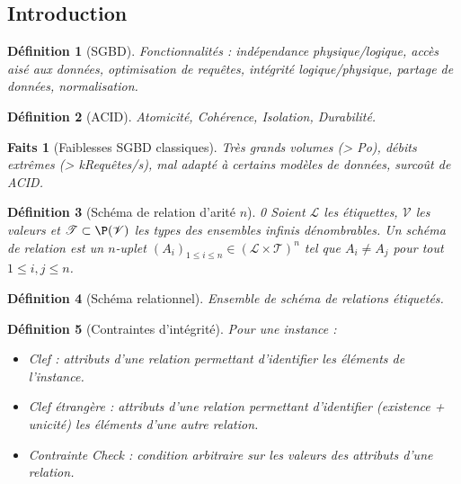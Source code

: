 \documentclass[landscape]{article}
\renewcommand{\L}{\mathscr{L}}
\newcommand{\V}{\mathscr{V}}
\newcommand{\T}{\mathscr{T}}
\newcommand{\1}{\mathbbm{1}}
\newtheorem{defi}{Définition}
\newtheorem{fact}{Faits}
\begin{document}
\begin{multicols}{2}

    \section{Introduction}

    \begin{defi}[SGBD] Fonctionnalités : indépendance physique/logique, accès aisé
        aux données, optimisation de requêtes, intégrité logique/physique,
        partage de données, normalisation.
    \end{defi}

    \begin{defi}[ACID] Atomicité, Cohérence, Isolation, Durabilité.
    \end{defi}

    \begin{fact}[Faiblesses SGBD classiques] Très grands volumes (> Po), débits
        extrêmes (> kRequêtes/s), mal adapté à certains modèles de données, surcoût
        de ACID.
    \end{fact}

    \begin{defi}[Schéma de relation d'arité $n$]0
        Soient $\L$ les étiquettes, $\V$ les valeurs et $\T\subset\P(\V)$ les types
        des ensembles infinis dénombrables. Un schéma de relation est un $n$-uplet
        $(A_i)_{1\leq i \leq n}\in(\L\times \T)^n$ tel que $A_i\neq A_j$ pour tout
        $1\leq i,j\leq n$.
    \end{defi}

    \begin{defi}[Schéma relationnel] Ensemble de schéma de relations étiquetés.
    \end{defi}

    \begin{defi}[Contraintes d'intégrité] Pour une instance :\begin{itemize}
        \item Clef : attributs d'une relation permettant d'identifier les
            éléments de l'instance.
        \item Clef étrangère : attributs d'une relation permettant d'identifier
            (existence + unicité) les éléments d'une autre relation.
        \item Contrainte Check : condition arbitraire sur les valeurs des attributs
            d'une relation.
    \end{itemize}\end{defi}


\end{multicols}
\end{document}
